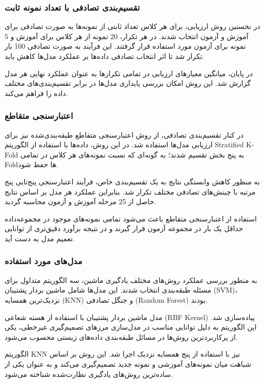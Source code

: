\subsubsection{تقسیم‌بندی تصادفی با تعداد نمونه ثابت}

در نخستین روش ارزیابی، برای هر کلاس تعداد ثابتی از نمونه‌ها به صورت تصادفی برای آموزش و آزمون انتخاب شدند. در هر تکرار، 20 نمونه از هر کلاس برای آموزش و 5 نمونه برای آزمون مورد استفاده قرار گرفتند. این فرآیند به صورت تصادفی 100 بار تکرار شد تا اثر انتخاب تصادفی داده‌ها بر عملکرد مدل‌ها کاهش یابد.

در پایان، میانگین معیارهای ارزیابی در تمامی تکرارها به عنوان عملکرد نهایی هر مدل گزارش شد. این روش امکان بررسی پایداری مدل‌ها در برابر تقسیم‌بندی‌های مختلف داده را فراهم می‌کند.


\subsubsection{اعتبارسنجی متقاطع}

در کنار تقسیم‌بندی تصادفی، از روش اعتبارسنجی متقاطع طبقه‌بندی‌شده نیز برای ارزیابی مدل‌ها استفاده شد. در این روش، داده‌ها با استفاده از الگوریتم Stratified K-Fold به پنج بخش تقسیم شدند؛ به گونه‌ای که نسبت نمونه‌های هر کلاس در تمامی Foldها حفظ شود.

به منظور کاهش وابستگی نتایج به یک تقسیم‌بندی خاص، فرآیند اعتبارسنجی پنج‌تایی پنج مرتبه با چینش‌های تصادفی مختلف تکرار شد. بنابراین عملکرد هر مدل بر اساس نتایج حاصل از 25 مرحله آموزش و آزمون محاسبه گردید.

استفاده از اعتبارسنجی متقاطع باعث می‌شود تمامی نمونه‌های موجود در مجموعه‌داده حداقل یک بار در مجموعه آزمون قرار گیرند و در نتیجه برآورد دقیق‌تری از توانایی تعمیم مدل به دست آید.



\subsubsection{مدل‌های مورد استفاده}

به منظور بررسی عملکرد روش‌های مختلف یادگیری ماشین، سه الگوریتم متداول برای مسئله طبقه‌بندی انتخاب شدند. این مدل‌ها شامل ماشین بردار پشتیبان (SVM)، نزدیک‌ترین همسایه (KNN) و جنگل تصادفی (Random Forest) بودند.

مدل ماشین بردار پشتیبان با استفاده از هسته شعاعی (RBF Kernel) پیاده‌سازی شد. این الگوریتم به دلیل توانایی مناسب در مدل‌سازی مرزهای تصمیم‌گیری غیرخطی، یکی از پرکاربردترین روش‌ها در مسائل طبقه‌بندی داده‌های زیستی محسوب می‌شود.

الگوریتم KNN نیز با استفاده از پنج همسایه نزدیک اجرا شد. این روش بر اساس شباهت میان نمونه‌های آموزشی و نمونه جدید تصمیم‌گیری می‌کند و به عنوان یکی از ساده‌ترین روش‌های یادگیری نظارت‌شده شناخته می‌شود.

